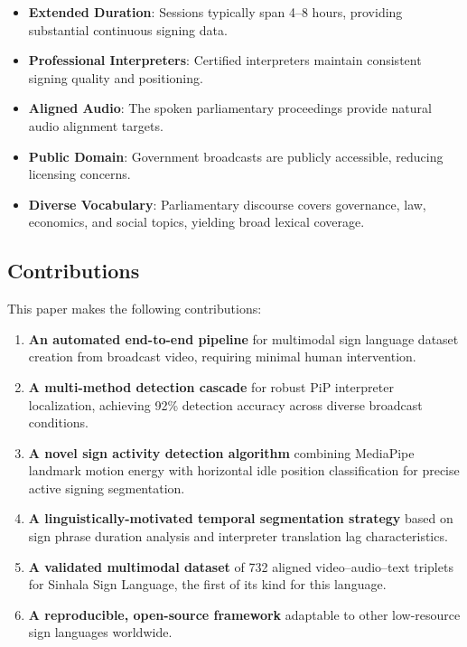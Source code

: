 \documentclass[journal]{IEEEtran}
\begin{document}
\begin{itemize}
    \item \textbf{Extended Duration}: Sessions typically span 4--8 hours, providing substantial continuous signing data.
    \item \textbf{Professional Interpreters}: Certified interpreters maintain consistent signing quality and positioning.
    \item \textbf{Aligned Audio}: The spoken parliamentary proceedings provide natural audio alignment targets.
    \item \textbf{Public Domain}: Government broadcasts are publicly accessible, reducing licensing concerns.
    \item \textbf{Diverse Vocabulary}: Parliamentary discourse covers governance, law, economics, and social topics, yielding broad lexical coverage.
\end{itemize}

\subsection{Contributions}

This paper makes the following contributions:

\begin{enumerate}
    \item \textbf{An automated end-to-end pipeline} for multimodal sign language dataset creation from broadcast video, requiring minimal human intervention.
    \item \textbf{A multi-method detection cascade} for robust PiP interpreter localization, achieving 92\% detection accuracy across diverse broadcast conditions.
    \item \textbf{A novel sign activity detection algorithm} combining MediaPipe landmark motion energy with horizontal idle position classification for precise active signing segmentation.
    \item \textbf{A linguistically-motivated temporal segmentation strategy} based on sign phrase duration analysis and interpreter translation lag characteristics.
    \item \textbf{A validated multimodal dataset} of 732 aligned video--audio--text triplets for Sinhala Sign Language, the first of its kind for this language.
    \item \textbf{A reproducible, open-source framework} adaptable to other low-resource sign languages worldwide.
\end{enumerate}
\end{document}
